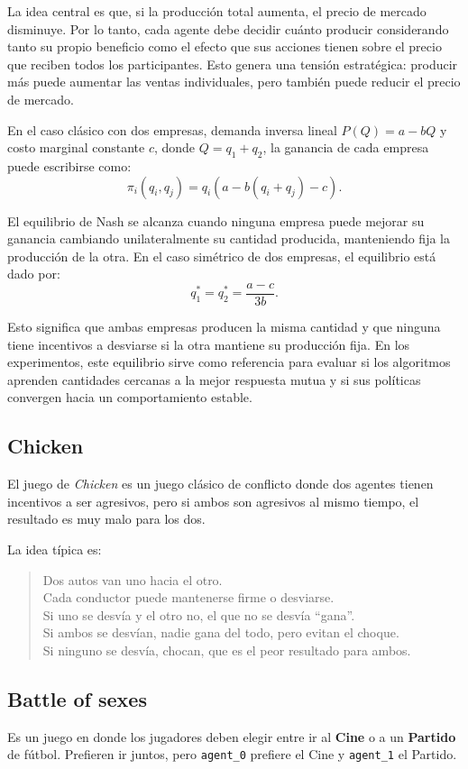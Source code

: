 \documentclass[letterpaper,12pt]{article} %
\begin{document}
La idea central es que, si la producción total aumenta, el precio de mercado disminuye. Por lo tanto, cada agente debe decidir cuánto producir considerando tanto su propio beneficio como el efecto que sus acciones tienen sobre el precio que reciben todos los participantes. Esto genera una tensión estratégica: producir más puede aumentar las ventas individuales, pero también puede reducir el precio de mercado.

En el caso clásico con dos empresas, demanda inversa lineal $P(Q)=a-bQ$ y costo marginal constante $c$, donde $Q=q_1+q_2$, la ganancia de cada empresa puede escribirse como:
\[
\pi_i(q_i,q_j)=q_i(a-b(q_i+q_j)-c).
\]

El equilibrio de Nash se alcanza cuando ninguna empresa puede mejorar su ganancia cambiando unilateralmente su cantidad producida, manteniendo fija la producción de la otra. En el caso simétrico de dos empresas, el equilibrio está dado por:
\[
q_1^* = q_2^* = \frac{a-c}{3b}.
\]

Esto significa que ambas empresas producen la misma cantidad y que ninguna tiene incentivos a desviarse si la otra mantiene su producción fija. En los experimentos, este equilibrio sirve como referencia para evaluar si los algoritmos aprenden cantidades cercanas a la mejor respuesta mutua y si sus políticas convergen hacia un comportamiento estable.

\subsection{Chicken}

El juego de \textit{Chicken} es un juego clásico de conflicto donde dos agentes tienen incentivos a ser agresivos, pero si ambos son agresivos al mismo tiempo, el resultado es muy malo para los dos.

La idea típica es:

\begin{quote}
Dos autos van uno hacia el otro.\\
Cada conductor puede mantenerse firme o desviarse.\\
Si uno se desvía y el otro no, el que no se desvía ``gana''.\\
Si ambos se desvían, nadie gana del todo, pero evitan el choque.\\
Si ninguno se desvía, chocan, que es el peor resultado para ambos.
\end{quote}

\subsection{Battle of sexes}
Es un juego en donde los jugadores deben elegir entre ir al \textbf{Cine} o a un \textbf{Partido} de fútbol. Prefieren ir juntos, pero \texttt{agent\_0} prefiere el Cine y \texttt{agent\_1} el Partido.
\end{document}
